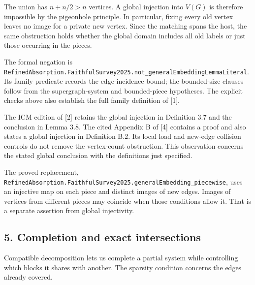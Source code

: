 \documentclass[english,11pt,a4paper]{article}
\begin{document}
The union has \(n+n/2>n\) vertices. A global injection into \(V(G)\) is therefore impossible by the pigeonhole principle. In particular, fixing every old vertex leaves no image for a private new vertex. Since the matching spans the host, the same obstruction holds whether the global domain includes all old labels or just those occurring in the pieces.

The formal negation is \texttt{Refined\allowbreak{}Absorption.\allowbreak{}Faithful\allowbreak{}Survey2025.\allowbreak{}not\_\allowbreak{}general\allowbreak{}Embedding\allowbreak{}Lemma\allowbreak{}Literal}. Its family predicate records the edge-incidence bound; the bounded-size clauses follow from the supergraph-system and bounded-piece hypotheses. The explicit checks above also establish the full family definition of {[}1{]}.

The ICM edition of {[}2{]} retains the global injection in Definition 3.7 and the conclusion in Lemma 3.8. The cited Appendix B of {[}4{]} contains a proof and also states a global injection in Definition B.2. Its local load and new-edge collision controls do not remove the vertex-count obstruction. This observation concerns the stated global conclusion with the definitions just specified.

The proved replacement, \texttt{Refined\allowbreak{}Absorption.\allowbreak{}Faithful\allowbreak{}Survey2025.\allowbreak{}general\allowbreak{}Embedding\_\allowbreak{}piecewise}, uses an injective map on each piece and distinct images of new edges. Images of vertices from different pieces may coincide when those conditions allow it. That is a separate assertion from global injectivity.

\subsection{5. Completion and exact intersections}\label{completion-and-exact-intersections}

Compatible decomposition lets us complete a partial system while controlling which blocks it shares with another. The sparsity condition concerns the edges already covered.
\end{document}
